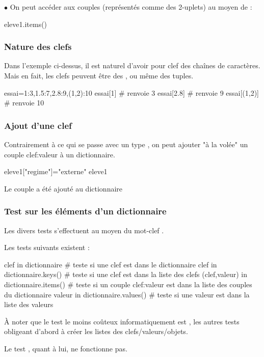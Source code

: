 \documentclass[11pt,a4paper,french,twoside]{PMCours}
\begin{document}
$\bullet$ On peut accéder aux couples  (représentés comme des 
2-uplets) au moyen de  : 
\begin{Python}
eleve1.items()
\end{Python}
\subsubsection*{Nature des clefs}
Dans l'exemple ci-dessus, il est naturel d'avoir pour clef des chaînes de caractères. \\
Mais en fait, les clefs peuvent être des ,  ou même des tuples.
\begin{Python}
essai={1:3,1.5:7,2.8:9,(1,2):10}
essai[1]         # renvoie 3
essai[2.8]       # renvoie 9
essai[(1,2)]     # renvoie 10
\end{Python}
\subsubsection*{Ajout d'une clef}
Contrairement à ce qui se passe avec un type , on peut ajouter "à la volée" un 
couple clef:valeur à un dictionnaire.

\begin{Python}
eleve1["regime"]="externe"
eleve1
\end{Python}
Le couple  a été ajouté au dictionnaire  

\subsubsection*{Test sur les éléments d'un dictionnaire}

Les divers tests s'effectuent au moyen du mot-clef  .

Les tests suivants existent :  
\begin{Python}
clef in dictionnaire
# teste si une clef est dans le dictionnaire
clef in dictionnaire.keys()
# teste si une clef est dans la liste des clefs
(clef,valeur) in dictionnaire.items()
# teste si un couple clef:valeur est dans la liste des couples du dictionnaire
valeur in dictionnaire.values()
# teste si une valeur est dans la liste des valeurs
\end{Python}
\`A noter que le test le moins coûteux informatiquement est , 
les autres tests obligeant d'abord à créer les listes des clefs/valeurs/objets.

Le test , quant à lui, ne fonctionne pas. 
\end{document}
